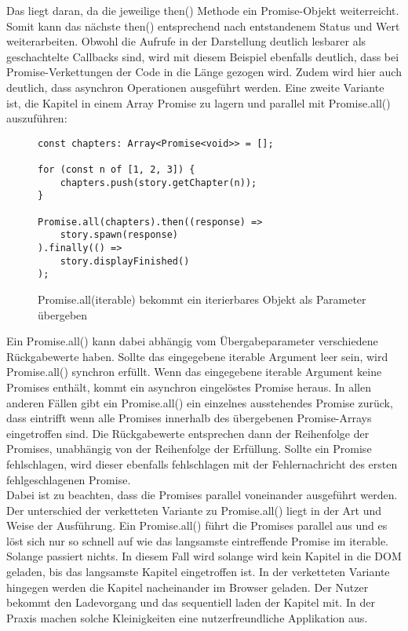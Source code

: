 \noindent
Das liegt daran, da die jeweilige then() Methode ein Promise-Objekt weiterreicht. Somit kann das nächste then() entsprechend nach entstandenem Status und Wert weiterarbeiten. Obwohl die Aufrufe in der Darstellung deutlich lesbarer als geschachtelte Callbacks sind, wird mit diesem Beispiel ebenfalls deutlich, dass bei Promise-Verkettungen der Code in die Länge gezogen wird. Zudem wird hier auch deutlich, dass asynchron Operationen ausgeführt werden. Eine zweite Variante ist, die Kapitel in einem Array Promise zu lagern und parallel mit Promise.all() auszuführen: 

\begin{figure}[H]
\begin{lstlisting}[basicstyle=\small]
const chapters: Array<Promise<void>> = [];

for (const n of [1, 2, 3]) {
    chapters.push(story.getChapter(n));
}

Promise.all(chapters).then((response) =>
    story.spawn(response)
).finally(() =>
    story.displayFinished()
);
\end{lstlisting}
\caption{Promise.all(iterable) bekommt ein iterierbares Objekt als Parameter übergeben}
\end{figure}

\noindent
Ein Promise.all() kann dabei abhängig vom Übergabeparameter verschiedene Rückgabewerte haben. Sollte das eingegebene iterable Argument leer sein, wird Promise.all() synchron erfüllt. Wenn das eingegebene iterable Argument keine Promises enthält, kommt ein asynchron eingelöstes Promise heraus. In allen anderen Fällen gibt ein Promise.all() ein einzelnes ausstehendes Promise zurück, dass eintrifft wenn alle Promises innerhalb des übergebenen Promise-Arrays eingetroffen sind. Die Rückgabewerte entsprechen dann der Reihenfolge der Promises, unabhängig von der Reihenfolge der Erfüllung.\cite{promise-all} Sollte ein Promise fehlschlagen, wird dieser ebenfalls fehlschlagen mit der Fehlernachricht des ersten fehlgeschlagenen Promise.\cite{promise-executor}\\

\noindent
Dabei ist zu beachten, dass die Promises parallel voneinander ausgeführt werden. Der unterschied der verketteten Variante zu Promise.all() liegt in der Art und Weise der Ausführung. Ein Promise.all() führt die Promises parallel aus und es löst sich nur so schnell auf wie das langsamste eintreffende Promise im iterable. Solange passiert nichts. In diesem Fall wird solange wird kein Kapitel in die DOM geladen, bis das langsamste Kapitel eingetroffen ist. In der verketteten Variante hingegen werden die Kapitel nacheinander im Browser geladen. Der Nutzer bekommt den Ladevorgang und das sequentiell laden der Kapitel mit. In der Praxis machen solche Kleinigkeiten eine nutzerfreundliche Applikation aus. 

